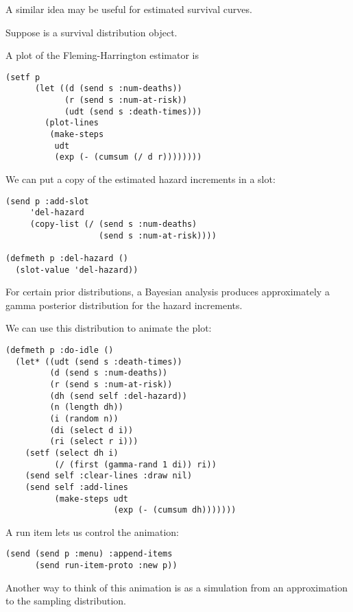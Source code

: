 \begin{slide}{}
A similar idea may be useful for estimated survival curves.

Suppose  is a survival distribution object.

A plot of the Fleming-Harrington estimator is
{\Large
\begin{verbatim}
(setf p
      (let ((d (send s :num-deaths))
            (r (send s :num-at-risk))
            (udt (send s :death-times)))
        (plot-lines
         (make-steps
          udt
          (exp (- (cumsum (/ d r))))))))
\end{verbatim}}
\end{slide}

\begin{slide}{}
We can put a copy of the estimated hazard increments in a slot:
{\Large
\begin{verbatim}
(send p :add-slot 
     'del-hazard
     (copy-list (/ (send s :num-deaths)
                   (send s :num-at-risk))))

(defmeth p :del-hazard ()
  (slot-value 'del-hazard))
\end{verbatim}}
For certain prior distributions, a Bayesian analysis produces
approximately a gamma posterior distribution for the hazard increments.
\end{slide}

\begin{slide}{}
We can use this distribution to animate the plot:
{\Large
\begin{verbatim}
(defmeth p :do-idle ()
  (let* ((udt (send s :death-times))
         (d (send s :num-deaths))
         (r (send s :num-at-risk))
         (dh (send self :del-hazard))
         (n (length dh))
         (i (random n))
         (di (select d i))
         (ri (select r i)))
    (setf (select dh i)
          (/ (first (gamma-rand 1 di)) ri))
    (send self :clear-lines :draw nil)
    (send self :add-lines
          (make-steps udt
                      (exp (- (cumsum dh)))))))
\end{verbatim}}
A run item lets us control the animation:
{\Large
\begin{verbatim}
(send (send p :menu) :append-items
      (send run-item-proto :new p))
\end{verbatim}}
Another way to think of this animation is as a simulation
from an approximation to the sampling distribution.
\end{slide}

